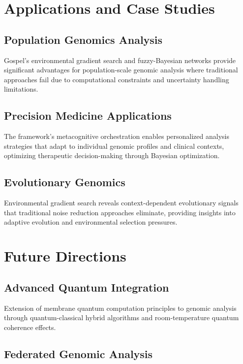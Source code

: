 \documentclass[12pt,a4paper]{article}
\begin{document}
\section{Applications and Case Studies}

\subsection{Population Genomics Analysis}

Gospel's environmental gradient search and fuzzy-Bayesian networks provide significant advantages for population-scale genomic analysis where traditional approaches fail due to computational constraints and uncertainty handling limitations.

\subsection{Precision Medicine Applications}

The framework's metacognitive orchestration enables personalized analysis strategies that adapt to individual genomic profiles and clinical contexts, optimizing therapeutic decision-making through Bayesian optimization.

\subsection{Evolutionary Genomics}

Environmental gradient search reveals context-dependent evolutionary signals that traditional noise reduction approaches eliminate, providing insights into adaptive evolution and environmental selection pressures.

\section{Future Directions}

\subsection{Advanced Quantum Integration}

Extension of membrane quantum computation principles to genomic analysis through quantum-classical hybrid algorithms and room-temperature quantum coherence effects.

\subsection{Federated Genomic Analysis}
\end{document}
